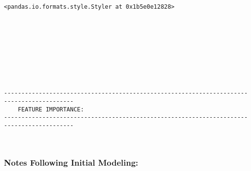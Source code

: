 \documentclass[11pt]{article}
\begin{document}
    
    \begin{verbatim}
<pandas.io.formats.style.Styler at 0x1b5e0e12828>
    \end{verbatim}

    
    \begin{Verbatim}[commandchars=\\\{\}]



    \end{Verbatim}

    \begin{center}
    \end{center}
    { \hspace*{\fill} \\}
    
    \begin{center}
    \end{center}
    { \hspace*{\fill} \\}
    
    \begin{Verbatim}[commandchars=\\\{\}]


------------------------------------------------------------------------------------------
	FEATURE IMPORTANCE:
------------------------------------------------------------------------------------------

    \end{Verbatim}

    \begin{center}
    \end{center}
    { \hspace*{\fill} \\}
    
    \hypertarget{notes-following-initial-modeling}{%
\subsubsection{Notes Following Initial
Modeling:}\label{notes-following-initial-modeling}}
\end{document}

